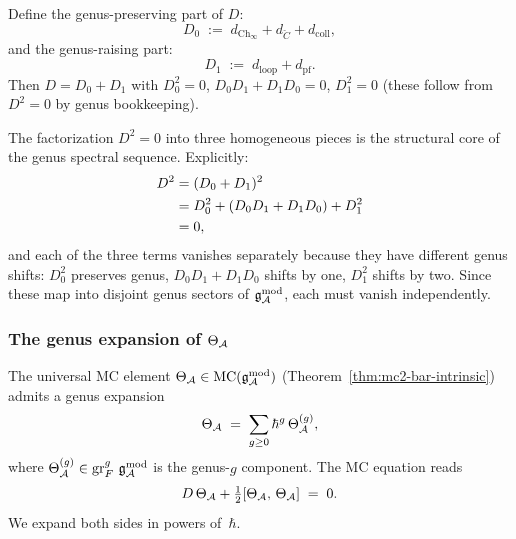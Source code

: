 \begin{definition}
\label{def:thqg-VII-D-split}
Define the genus-preserving part of $D$:
\begin{equation}\label{eq:thqg-VII-D0}
D_0
\;:=\;
d_{\mathrm{Ch}_\infty}
+ d_{\check{C}}
+ d_{\mathrm{coll}},
\end{equation}
and the genus-raising part:
\begin{equation}\label{eq:thqg-VII-D1}
D_1
\;:=\;
d_{\mathrm{loop}}
+ d_{\mathrm{pf}}.
\end{equation}
Then $D = D_0 + D_1$ with $D_0^2 = 0$,
$D_0 D_1 + D_1 D_0 = 0$, $D_1^2 = 0$
(these follow from $D^2 = 0$ by genus bookkeeping).
\end{definition}

\begin{remark}
\label{rem:thqg-VII-three-identities}
The factorization $D^2 = 0$ into three homogeneous pieces is the
structural core of the genus spectral sequence. Explicitly:
\begin{align}
D^2 &= (D_0 + D_1)^2 \notag\\
&= D_0^2 + (D_0 D_1 + D_1 D_0) + D_1^2 \notag\\
&= 0,\label{eq:thqg-VII-D-squared-decomp}
\end{align}
and each of the three terms vanishes separately because they
have different genus shifts: $D_0^2$ preserves genus,
$D_0 D_1 + D_1 D_0$ shifts by one, $D_1^2$ shifts by two.
Since these map into disjoint genus sectors of $\mathfrak{g}_{\mathcal{A}}^{\mathrm{mod}}$,
each must vanish independently.
\end{remark}

\subsubsection{The genus expansion of $\Theta_{\mathcal{A}}$}
\label{subsubsec:thqg-VII-genus-expansion}

The universal MC element $\Theta_{\mathcal{A}} \in \text{MC}(\mathfrak{g}_{\mathcal{A}}^{\mathrm{mod}})$
(Theorem~\ref{thm:mc2-bar-intrinsic}) admits a genus expansion
\begin{equation}\label{eq:thqg-VII-theta-genus-exp}
\Theta_{\mathcal{A}}
\;=\;
\sum_{g \geq 0} \hbar^g\,\Theta^{(g)}_{\mathcal{A}},
\end{equation}
where $\Theta^{(g)}_{\mathcal{A}} \in \operatorname{gr}^g_F\,\mathfrak{g}_{\mathcal{A}}^{\mathrm{mod}}$ is the genus-$g$
component. The MC equation reads
\begin{equation}\label{eq:thqg-VII-mc-full}
D\,\Theta_{\mathcal{A}}
+ \tfrac{1}{2}[\Theta_{\mathcal{A}},\, \Theta_{\mathcal{A}}]
\;=\; 0.
\end{equation}
We expand both sides in powers of~$\hbar$.


